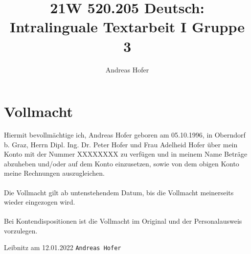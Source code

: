 \documentclass{article}
\title{21W 520.205 Deutsch: Intralinguale Textarbeit I Gruppe 3}
\author{Andreas Hofer}
\begin{document}
	\section*{Vollmacht}
	Hiermit bevollmächtige ich, Andreas Hofer geboren am 05.10.1996, in Oberndorf b. Graz, Herrn Dipl. Ing. Dr. Peter Hofer und Frau Adelheid Hofer über mein Konto mit der Nummer XXXXXXXX zu verfügen und in meinem Name Beträge abzuheben und/oder auf dem Konto einzusetzen, sowie von dem obigen Konto meine Rechnungen auszugleichen. \\ \\
	Die Vollmacht gilt ab untenstehendem Datum, bis die Vollmacht meinerseits wieder eingezogen wird. \\ \\
	Bei Kontendispositionen ist die Vollmacht im Original und der Personalausweis vorzulegen.

	\vspace*{\fill}
	Leibnitz am 12.01.2022 \hspace{8cm} \texttt{\small{Andreas Hofer}}
\end{document}
